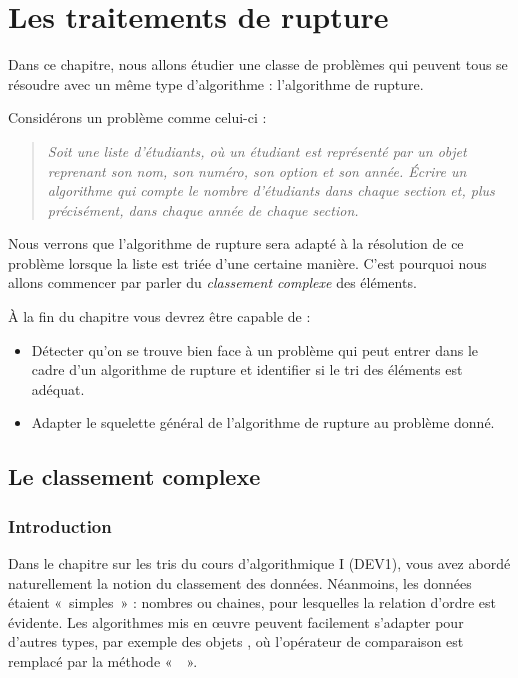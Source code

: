 \chapter{Les traitements de rupture}
\label{chap:rupture}

	Dans ce chapitre, nous allons étudier une classe de problèmes 
	qui peuvent tous se résoudre avec un même type d'algorithme :
	l'algorithme de rupture. 
	
	Considérons un problème comme celui-ci :
	\begin{quotation}
		\slshape
		\og{}Soit une liste d'étudiants, 
		où un étudiant est représenté par un objet reprenant son nom,
		son numéro, son option et son année.
		Écrire un algorithme qui compte le nombre d'étudiants dans chaque section
		et, plus précisément, dans chaque année de chaque section.\fg{}
	\end{quotation}
	
	Nous verrons que l'algorithme de rupture sera adapté à la résolution de
        ce problème lorsque la liste est triée d'une certaine manière.
	C'est pourquoi nous allons commencer par parler du \emph{classement complexe}
	des éléments.
	
	À la fin du chapitre vous
	devrez être capable de :	
	\begin{itemize}
		\item 
			Détecter qu'on se trouve bien face à un problème qui
			peut entrer dans le cadre d'un algorithme de rupture
			et identifier si le tri des éléments est adéquat.
		\item 
			Adapter le squelette général de l'algorithme de rupture
			au problème donné.
	\end{itemize}

\section{Le classement complexe}

\subsection*{Introduction}

	Dans le chapitre sur les tris du cours d'algorithmique I (DEV1), 
	vous avez abordé naturellement la notion du classement des données. 
	Néanmoins, les données étaient «~simples~» : 
	nombres ou chaines, pour lesquelles la relation d’ordre est évidente. 
	Les algorithmes mis en œuvre peuvent facilement s’adapter pour d’autres types, 
	par exemple des objets , où l’opérateur de comparaison est remplacé par la méthode
	«~~».
	
